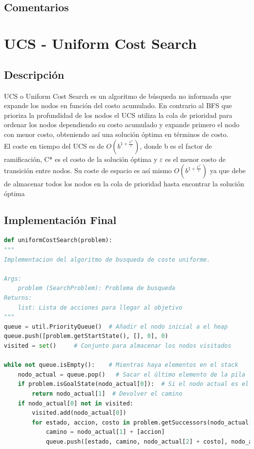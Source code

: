 \documentclass{report}
\begin{document}
        \subsection*{Comentarios}
      \clearpage\section{UCS - Uniform Cost Search}
        \subsection*{Descripción}
          \paragraph*{}{
            UCS o Uniform Cost Search es un algoritmo de búsqueda no informada que expande los nodos en función del costo acumulado. En contrario al BFS que prioriza la profundidad de los nodos el UCS utiliza la cola de prioridad para ordenar los nodos dependiendo su costo acumulado y expande primero el nodo con menor costo, obteniendo así una solución óptima en términos de costo.\\  
            El coste en tiempo del UCS es de \( O(b^{1 +\frac{ C^*}{\varepsilon}}) \), donde b es el factor de ramificación, C* es el costo de la solución óptima y \( \varepsilon \)  es el menor costo de transición entre nodos. Su coste de espacio es así mismo \( O(b^{1 +\frac{ C^*}{\varepsilon}}) \) ya que debe de almacenar todos los nodos en la cola de prioridad hasta encontrar la solución óptima \\
          }
        \subsection*{Implementación Final}
          \begin{lstlisting}[language=Python, caption=Implementación final del UCS]
def uniformCostSearch(problem):
"""
Implementacion del algoritmo de busqueda de coste uniforme.

Args:
    problem (SearchProblem): Problema de busqueda
Returns:
    list: Lista de acciones para llegar al objetivo
"""
queue = util.PriorityQueue()  # Añadir el nodo inicial a el heap
queue.push([problem.getStartState(), [], 0], 0)
visited = set()     # Conjunto para almacenar los nodos visitados

while not queue.isEmpty():    # Mientras haya elementos en el stack
    nodo_actual = queue.pop()   # Sacar el último elemento de la pila
    if problem.isGoalState(nodo_actual[0]):  # Si el nodo actual es el objetivo
        return nodo_actual[1]  # Devolver el camino
    if nodo_actual[0] not in visited:
        visited.add(nodo_actual[0])
        for estado, accion, costo in problem.getSuccessors(nodo_actual[0]): # Añadir los hijos del nodo actual a la pila
            camino = nodo_actual[1] + [accion]
            queue.push([estado, camino, nodo_actual[2] + costo], nodo_actual[2] + costo)
          \end{lstlisting}
\end{document}
